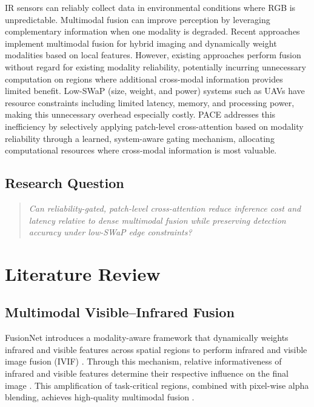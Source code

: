\documentclass[conference]{IEEEtran}
\begin{document}
IR sensors can reliably collect data in environmental conditions where RGB is unpredictable. Multimodal fusion can improve perception by leveraging complementary information when one modality is degraded. Recent approaches implement multimodal fusion for hybrid imaging and dynamically weight modalities based on local features. However, existing approaches perform fusion without regard for existing modality reliability, potentially incurring unnecessary computation on regions where additional cross-modal information provides limited benefit. Low-SWaP (size, weight, and power) systems such as UAVs have resource constraints including limited latency, memory, and processing power, making this unnecessary overhead especially costly. PACE addresses this inefficiency by selectively applying patch-level cross-attention based on modality reliability through a learned, system-aware gating mechanism, allocating computational resources where cross-modal information is most valuable.


\subsection{Research Question}

\begin{quote}
\textit{Can reliability-gated, patch-level cross-attention reduce inference cost and latency relative to dense multimodal fusion while preserving detection accuracy under low-SWaP edge constraints? 
}
\end{quote}

\color{black}
\section{Literature Review}
\color{black}

\subsection{Multimodal Visible--Infrared Fusion}

FusionNet introduces a modality-aware framework that dynamically weights infrared and visible features across spatial regions to perform infrared and visible image fusion (IVIF) \cite{fusionnet2025}. Through this mechanism, relative informativeness of infrared and visible features determine their respective influence on the final image \cite{fusionnet2025}. This amplification of task-critical regions, combined with pixel-wise alpha blending, achieves high-quality multimodal fusion \cite{fusionnet2025}. \
\end{document}
